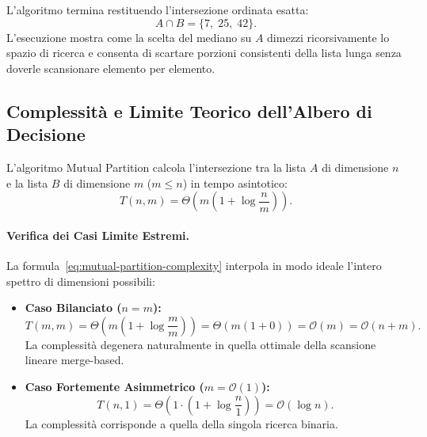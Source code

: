 L'algoritmo termina restituendo l'intersezione ordinata esatta:
\begin{equation}
  A \cap B = \{7, \; 25, \; 42\}.
\end{equation}
L'esecuzione mostra come la scelta del mediano su $A$ dimezzi ricorsivamente lo spazio di ricerca e consenta di scartare porzioni consistenti della lista lunga senza doverle scansionare elemento per elemento.

\FloatBarrier
\subsection{Complessità e Limite Teorico dell'Albero di Decisione}

\begin{theorem}
L'algoritmo Mutual Partition calcola l'intersezione tra la lista $A$ di dimensione $n$ e la lista $B$ di dimensione $m$ ($m \le n$) in tempo asintotico:
\begin{equation}
  T(n, m) = \Theta\left(m \left(1 + \log \frac{n}{m}\right)\right).
  \label{eq:mutual-partition-complexity}
\end{equation}
\end{theorem}

\paragraph{Verifica dei Casi Limite Estremi.}
La formula~\eqref{eq:mutual-partition-complexity} interpola in modo ideale l'intero spettro di dimensioni possibili:
\begin{itemize}
  \item \textbf{Caso Bilanciato ($n = m$):}
  \begin{equation}
    T(m, m) = \Theta\left(m \left(1 + \log \frac{m}{m}\right)\right) = \Theta(m (1 + 0)) = \mathcal{O}(m) = \mathcal{O}(n + m).
  \end{equation}
  La complessità degenera naturalmente in quella ottimale della scansione lineare merge-based.
  \item \textbf{Caso Fortemente Asimmetrico ($m = \mathcal{O}(1)$):}
  \begin{equation}
    T(n, 1) = \Theta\left(1 \cdot \left(1 + \log \frac{n}{1}\right)\right) = \mathcal{O}(\log n).
  \end{equation}
  La complessità corrisponde a quella della singola ricerca binaria.
\end{itemize}

\FloatBarrier
